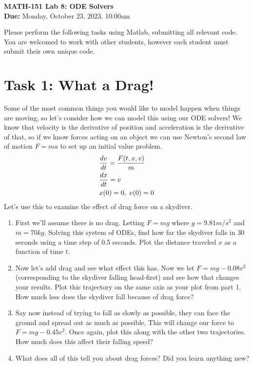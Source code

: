 \documentclass[11pt]{article}
\begin{document}
	
	\begin{center}
		\Large{\textbf{MATH-151 Lab 8: ODE Solvers}}\\
			\medskip
		\normalsize{\textbf{Due:} Monday, October 23, 2023, 10:00am} 
	\end{center}
	\noindent\makebox[\linewidth]{\rule{\textwidth}{0.4pt}}
	Please perform the following tasks using Matlab, submitting all relevant code. You are welcomed to work with other students, however each student must submit their own unique code.
	\section*{Task 1: What a Drag!}
	\noindent Some of the most common things you would like to model happen when things are moving, so let's consider how we can model this using our ODE solvers! We know that velocity is the derivative of position and acceleration is the derivative of that, so if we know forces acting on an object we can use Newton's second law of motion $F=ma$ to set up an initial value problem.
	\begin{align*}
		&\frac{dv}{dt} = \frac{F(t,x,v)}{m} \\
		&\frac{dx}{dt} = v \\
		&x(0) = 0, \hspace{0.1cm} v(0) = 0
	\end{align*}
	Let's use this to examine the effect of drag force on a skydiver.
	\begin{enumerate}[label=\alph*)]
		\item First we'll assume there is no drag. Letting $F = mg$ where $g=9.81 m/s^2$ and $m=70kg$. Solving this system of ODEs, find how far the skydiver falls in 30 seconds using a time step of 0.5 seconds. Plot the distance traveled $x$ as a function of time $t$.
		\item Now let's add drag and see what effect this has. Now we let $F = mg - 0.08v^2$ (corresponding to the skydiver falling head-first) and see how that changes your results. Plot this trajectory on the same axis as your plot from part 1. How much less does the skydiver fall because of drag force?   
		\item Say now instead of trying to fall as slowly as possible, they can face the ground and spread out as much as possible. This will change our force to $F = mg - 0.45v^2$. Once again, plot this along with the other two trajectories. How much does this affect their falling speed? 
		\item What does all of this tell you about drag forces? Did you learn anything new?
	\end{enumerate}
\end{document}
